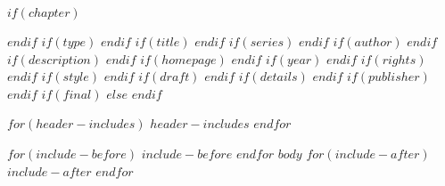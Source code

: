 $if(chapter)$
\setcounter{chapter}{$chapter$}
\addtocounter{chapter}{-1}
$endif$
$if(type)$
\renewcommand{\bookgentype}{$type$}
$endif$
$if(title)$
\renewcommand{\titleinfo}{$title$}
$endif$
$if(series)$
\renewcommand{\seriesinfo}{$series$}
$endif$
$if(author)$
\renewcommand{\authorinfo}{$author$}
$endif$
$if(description)$
\renewcommand{\descriptioninfo}{$description$}
$endif$
$if(homepage)$
\renewcommand{\homepageinfo}{$homepage$}
$endif$
$if(year)$
\renewcommand{\yearinfo}{$year$}
$endif$
$if(rights)$
\renewcommand{\rightsinfo}{$rights$}
$endif$
$if(style)$
\renewcommand{\editioninfo}{\capitalisewords{$style$}}
$endif$
$if(draft)$
\renewcommand{\draftinfo}{$draft$}
$endif$
$if(details)$
\renewcommand{\detailsinfo}{$details$}
$endif$
$if(publisher)$
\renewcommand{\publisherinfo}{$publisher$}
$endif$
$if(final)$
\DraftOff
$else$
\DraftOn
$endif$

$for(header-includes)$
$header-includes$
$endfor$

$for(include-before)$
$include-before$
$endfor$
$body$
$for(include-after)$
$include-after$
$endfor$
